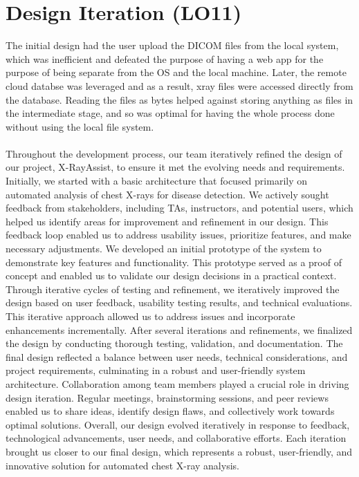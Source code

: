 \documentclass{article}
\begin{document}
\section{Design Iteration (LO11)}

The initial design had the user upload the DICOM files from the local system, which was inefficient and defeated the purpose of having a web app for the purpose of being separate from the OS and the local machine. Later, the remote cloud databse was leveraged and as a result, xray files were accessed directly from the database. Reading the files as bytes helped against storing anything as files in the intermediate stage, and so was optimal for having the whole process done without using the local file system. \\ \\
Throughout the development process, our team iteratively refined the design of our project, X-RayAssist, to ensure it met the evolving needs and requirements. Initially, we started with a basic architecture that focused primarily on automated analysis of chest X-rays for disease detection. We actively sought feedback from stakeholders, including TAs, instructors, and potential users, which helped us identify areas for improvement and refinement in our design. This feedback loop enabled us to address usability issues, prioritize features, and make necessary adjustments. We developed an initial prototype of the system to demonstrate key features and functionality. This prototype served as a proof of concept and enabled us to validate our design decisions in a practical context. Through iterative cycles of testing and refinement, we iteratively improved the design based on user feedback, usability testing results, and technical evaluations. This iterative approach allowed us to address issues and incorporate enhancements incrementally. After several iterations and refinements, we finalized the design by conducting thorough testing, validation, and documentation. The final design reflected a balance between user needs, technical considerations, and project requirements, culminating in a robust and user-friendly system architecture. Collaboration among team members played a crucial role in driving design iteration. Regular meetings, brainstorming sessions, and peer reviews enabled us to share ideas, identify design flaws, and collectively work towards optimal solutions. Overall, our design evolved iteratively in response to feedback, technological advancements, user needs, and collaborative efforts. Each iteration brought us closer to our final design, which represents a robust, user-friendly, and innovative solution for automated chest X-ray analysis.
\end{document}
